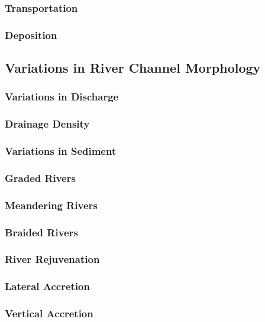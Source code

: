 \documentclass[../../main]{subfiles}
\begin{document}
\subsubsection{Transportation}

\subsubsection{Deposition}

\subsection{Variations in River Channel Morphology}


\subsubsection{Variations in Discharge}

\subsubsection{Drainage Density}

\subsubsection{Variations in Sediment}

\subsubsection{Graded Rivers}


\subsubsection{Meandering Rivers}

\subsubsection{Braided Rivers}


\subsubsection{River Rejuvenation}


\subsubsection{Lateral Accretion}

\subsubsection{Vertical Accretion}
\end{document}

